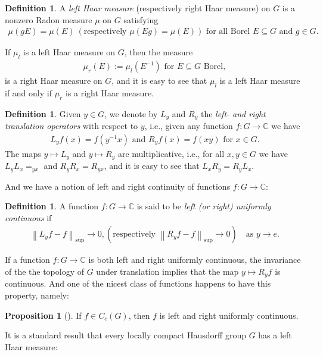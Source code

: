 \documentclass[10pt,twoside,openany,final]{memoir}
\theoremstyle{definition}
\newtheorem{proposition}[theorem]{Proposition}
\newtheorem{definition}[theorem]{Definition}
\theoremstyle{Break}
\newcommand{\lv}{\left\lVert}
\newcommand{\rv}{\right\rVert}
\newcommand{\C}{\mathbb{C}}
\begin{document}
\begin{definition}
	A \emph{left Haar measure} (respectively right Haar measure) on $G$ is a nonzero Radon measure $\mu$ on $G$ satisfying 
	\begin{align*}
		\mu(gE)=\mu(E)\ (\text{respectively } \mu(Eg)=\mu(E)) \text{ for all Borel } E \subseteq G \text{ and } g \in G.
	\end{align*}
\end{definition}
If $\mu_l$ is a left Haar measure on $G$, then the measure 
\begin{align*}
	\mu_r(E):=\mu_l(E^{-1}) \text{ for } E \subseteq G \text{ Borel},
\end{align*}
is a right Haar measure on $G$, and it is easy to see that $\mu_l$ is a left Haar measure if and only if $\mu_r$ is a right Haar measure. 
\begin{definition}
	Given $y \in G$, we denote by $L_y$ and $R_y$ the \emph{left- and right translation operators} with respect to $y$, i.e., given any function $f \colon G \to \C$ we have
\begin{align*}
	L_yf(x)=f(y^{-1}x) \text{  and  } R_yf(x)=f(xy) \text{ for } x \in G.
\end{align*}
The maps $y \mapsto L_y$ and $y \mapsto R_y$ are multiplicative, i.e., for all $x,y \in G$ we have $L_y L_x = _{yx}$ and $R_y R_x = R_{yx}$, and it is easy to see that $L_xR_y=R_yL_x$.
\end{definition}
And we have a notion of left and right continuity of functions $f \colon G \to \C$:
\begin{definition}
	A function $f \colon G \to \C$ is said to be \emph{left (or right) uniformly continuous} if
	\begin{align*}
		\lv L_yf -f \rv_{\sup}\to 0, (\textrm{respectively } \lv R_y f- f\rv_{\sup} \to 0 )\quad \text{as } y \to e. 
	\end{align*}
	\label{defuniflr}
\end{definition}
If a function $f \colon G \to \C$ is both left and right uniformly continuous, the invariance of the the topology of $G$ under translation implies that the map $y \mapsto R_yf$ is continuous. And one of the nicest class of functions happens to have this property, namely:
\begin{proposition}[\mbox{\cite[340]{folland2013real}}]
	If $f \in C_c(G)$, then $f$ is left and right uniformly continuous.
	\label{Cc lr uni cont}
\end{proposition}
It is a standard result that every locally compact Hausdorff group $G$ has a left Haar measure:
\end{document}
